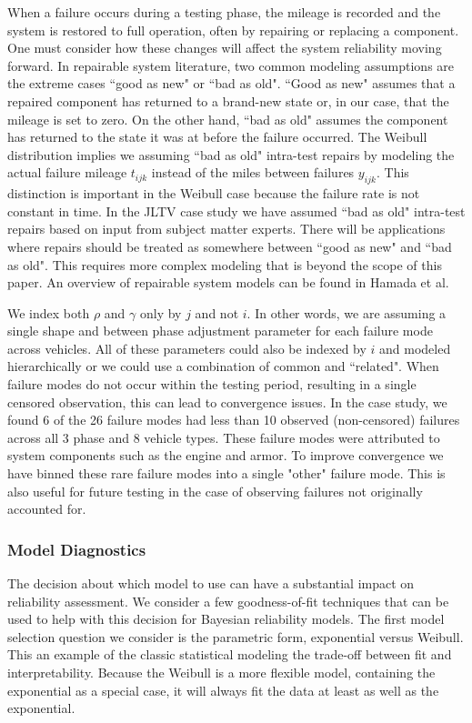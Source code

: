 \documentclass[12pt]{article}
\begin{document}
When a failure occurs during a testing phase, the mileage is recorded and the system is restored to full operation, often by repairing or replacing a component.  One must consider how these changes will affect the system reliability moving forward.  In repairable system literature, two common modeling assumptions are the extreme cases ``good as new" or ``bad as old".  ``Good as new" assumes that a repaired component has returned to a brand-new state or, in our case, that the mileage is set to zero.  On the other hand, ``bad as old" assumes the component has returned to the state it was at before the failure occurred.  The Weibull distribution implies we assuming ``bad as old" intra-test repairs by modeling the actual failure mileage $t_{ijk}$ instead of the miles between failures $y_{ijk}$.  This distinction is important in the Weibull case because the failure rate is not constant in time.  In the JLTV case study we have assumed ``bad as old" intra-test repairs based on input from subject matter experts.  There will be applications where repairs should be treated as somewhere between ``good as new" and ``bad as old".  This requires more complex modeling that is beyond the scope of this paper.  An overview of repairable system models can be found in Hamada et al. ~\cite{ref4}

We index both $\rho$ and
$\gamma$ only by $j$ and not $i$. In other words, we are assuming a single
shape and between phase adjustment parameter for each failure mode across
vehicles.  All of these parameters could also be indexed by $i$ and modeled
hierarchically or we could use a combination of common and ``related".  When failure modes do not occur within the testing period, resulting in a single censored observation, this can lead to convergence issues.  In the case study, we found 6 of the 26 failure modes had less than 10 observed (non-censored) failures across all 3 phase and 8 vehicle types.  These failure modes were attributed to system components such as the engine and armor.  To improve convergence we have binned these rare failure modes into a single "other" failure mode.  This is also useful for future testing in the case of observing failures not originally accounted for.

\subsubsection{Model Diagnostics}\label{modd}
The decision about which model to
use can have a substantial impact on reliability assessment.  We consider a
few  goodness-of-fit techniques that can be used to help with this decision for Bayesian reliability models.  The
first model selection question we consider is the parametric form,
exponential versus Weibull.  This an example of the classic statistical modeling
the trade-off between fit and interpretability.  Because the Weibull is a more
flexible model, containing the exponential as a special case, it will always fit the data at least as well as the exponential.
\end{document}
